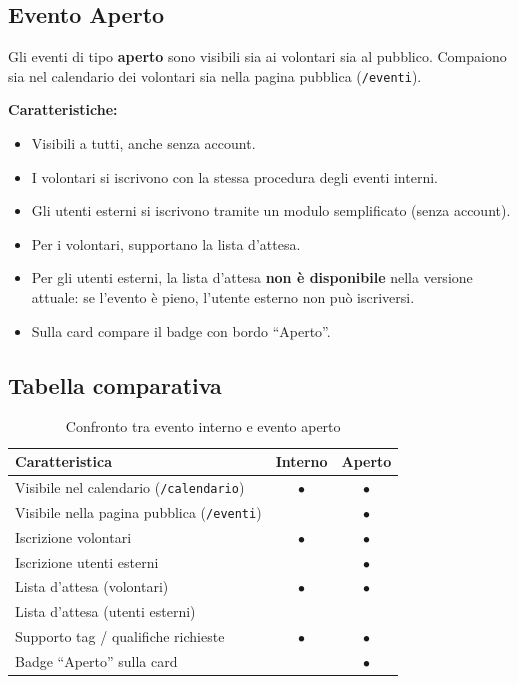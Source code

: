 \documentclass[a4paper,11pt,oneside]{book}
\newcommand{\percorso}[1]{\textcolor{namoCyan}{\texttt{#1}}}
\begin{document}
\subsection{Evento Aperto}

Gli eventi di tipo \textbf{aperto} sono visibili sia ai volontari sia al pubblico. Compaiono sia nel calendario dei volontari sia nella pagina pubblica (\percorso{/eventi}).

\textbf{Caratteristiche:}
\begin{itemize}[leftmargin=1.5em]
  \item Visibili a tutti, anche senza account.
  \item I volontari si iscrivono con la stessa procedura degli eventi interni.
  \item Gli utenti esterni si iscrivono tramite un modulo semplificato (senza account).
  \item Per i volontari, supportano la lista d'attesa.
  \item Per gli utenti esterni, la lista d'attesa \textbf{non \`e disponibile} nella versione attuale: se l'evento \`e pieno, l'utente esterno non pu\`o iscriversi.
  \item Sulla card compare il badge con bordo ``Aperto''.
\end{itemize}

\subsection{Tabella comparativa}

\begin{table}[htbp]
\centering
\caption{Confronto tra evento interno e evento aperto}
\label{tab:confronto-eventi}
\begin{tabularx}{\textwidth}{X c c}
\toprule
\textbf{Caratteristica} & \textbf{Interno} & \textbf{Aperto} \\
\midrule
Visibile nel calendario (\percorso{/calendario})          & $\bullet$ & $\bullet$ \\
Visibile nella pagina pubblica (\percorso{/eventi})        &           & $\bullet$ \\
Iscrizione volontari                                        & $\bullet$ & $\bullet$ \\
Iscrizione utenti esterni                                   &           & $\bullet$ \\
Lista d'attesa (volontari)                                  & $\bullet$ & $\bullet$ \\
Lista d'attesa (utenti esterni)                             &           &           \\
Supporto tag / qualifiche richieste                         & $\bullet$ & $\bullet$ \\
Badge ``Aperto'' sulla card                                 &           & $\bullet$ \\
\bottomrule
\end{tabularx}
\end{table}
\end{document}
